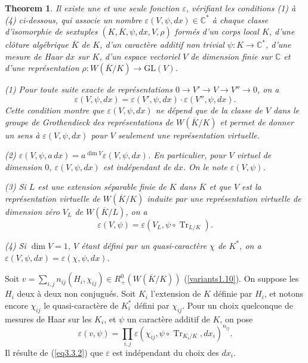 \documentclass[11pt,a4paper]{amsart}
\theoremstyle{plain}
\newtheorem{theorem}{Theorem}[section]
\theoremstyle{definition}
\DeclareMathOperator{\Tr}{Tr}
\newcommand{\dbC}{\mathbb{C}}
\newcommand{\GL}{\mathrm{GL}}
\def\dim{\mathop{\mathrm{dim}}\nolimits}
\newenvironment{para}{\par\noindent}{\par}
\newcommand{\ov}[1]{\overline{#1}}
\newcommand{\eps}{\varepsilon}
\begin{document}
\begin{theorem}\label{thm4.1}
Il existe une et une seule fonction $\eps$, v\'erifiant les conditions \textup{(1)} \`a \textup{(4)} ci-dessous, qui associe un nombre $\eps(V,\psi,dx) \in \dbC^{*}$ \`a chaque classe d'isomorphie de sextuples $(K, \ov{K}, \psi, dx, V, \rho)$ form\'es d'un corps local $K$, d'une cl\^oture alg\'ebrique $\ov{K}$ de $K$, d'un caract\`ere additif non trivial $\psi: K \to \dbC^{*}$, d'une mesure de Haar $dx$ sur $K$, d'un espace vectoriel $V$ de dimension finie sur $\dbC$ et d'une repr\'esentation $\rho: W(\ov{K}/K) \to \GL(V)$.

\textup{(1)} Pour toute suite exacte de repr\'esentations $0 \to V' \to V \to V'' \to 0$, on a
\[
\eps(V,\psi,dx) = \eps(V',\psi,dx) \cdot \eps(V'',\psi,dx).
\]
Cette condition montre que $\eps(V,\psi,dx)$ ne d\'epend que de la classe de $V$ dans le groupe de Grothendieck des repr\'esentations de $W(\ov{K}/K)$ et permet de donner un sens \`a $\eps(V,\psi,dx)$ pour $V$ seulement une repr\'esentation virtuelle.

\textup{(2)} $\eps(V,\psi,a\,dx) = a^{\dim V} \eps(V,\psi,dx)$. En particulier, pour $V$ virtuel de dimension $0$, $\eps(V,\psi,dx)$ est ind\'ependant de $dx$. On le note $\eps(V,\psi)$.

\textup{(3)} Si $L$ est une extension s\'eparable finie de $K$ dans $\ov{K}$ et que $V$ est la repr\'esentation virtuelle de $W(\ov{K}/K)$ induite par une repr\'esentation virtuelle de dimension z\'ero $V_{L}$ de $W(\ov{K}/L)$, on a
\[
\eps(V,\psi) = \eps(V_{L}, \psi \circ \Tr_{L/K}).
\]

\textup{(4)} Si $\dim V = 1$, $V$ \'etant d\'efini par un quasi-caract\`ere $\chi$ de $K^{*}$, on a $\eps(V,\psi,dx) = \eps(\chi,\psi,dx)$.
\end{theorem}

\begin{para}
Soit $v = \sum_{i,j} n_{ij}(H_{i},\chi_{ij}) \in R_{+}^{0}(W(\ov{K}/K))$ (\ref{variants1.10}). On suppose les $H_{i}$ deux \`a deux non conjugu\'es. Soit $K_{i}$ l'extension de $K$ d\'efinie par $H_{i}$, et notons encore $\chi_{ij}$ le quasi-caract\`ere de $K_{i}^{*}$ d\'efini par $\chi_{ij}$. Pour un choix quelconque de mesures de Haar sur les $K_{i}$, et $\psi$ un caract\`ere additif de $K$, on pose
\begin{equation}\label{eq4.2.1}
\eps(v,\psi) = \prod_{i,j} \eps(\chi_{ij}, \psi \circ \Tr_{K_{i}/K}, dx_{i})^{n_{ij}}.
\end{equation}
Il r\'esulte de (\ref{eq3.3.2}) que $\eps$ est ind\'ependant du choix des $dx_{i}$.
\end{para}
\end{document}
